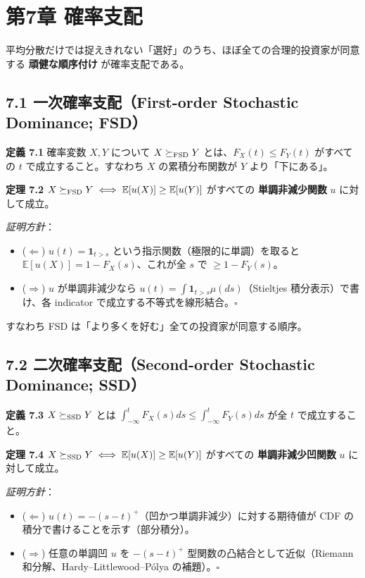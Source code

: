 \documentclass[11pt,a4paper]{report}
\begin{document}
\noindent\hrulefill

\chapter{第7章 確率支配}

平均分散だけでは捉えきれない「選好」のうち、ほぼ全ての合理的投資家が同意する \textbf{頑健な順序付け} が確率支配である。

\section{7.1 一次確率支配（First-order Stochastic Dominance; FSD）}

\textbf{定義 7.1} 確率変数 $X, Y$ について $X \succeq_{\rm FSD} Y$ とは、$F_X(t) \le F_Y(t)$ がすべての $t$ で成立すること。すなわち $X$ の累積分布関数が $Y$ より「下にある」。

\textbf{定理 7.2} $X \succeq_{\rm FSD} Y \iff \mathbb{E}[u(X)] \ge \mathbb{E}[u(Y)]$ がすべての \textbf{単調非減少関数} $u$ に対して成立。

\emph{証明方針}：
\begin{itemize}
\item ($\Leftarrow$) $u(t) = \mathbf{1}_{t > s}$ という指示関数（極限的に単調）を取ると $\mathbb{E}[u(X)] = 1 - F_X(s)$、これが全 $s$ で $\ge 1 - F_Y(s)$。
\item ($\Rightarrow$) $u$ が単調非減少なら $u(t) = \int \mathbf{1}_{t > s} \mu(ds)$（Stieltjes 積分表示）で書け、各 indicator で成立する不等式を線形結合。$\square$
\end{itemize}

すなわち FSD は「より多くを好む」全ての投資家が同意する順序。

\section{7.2 二次確率支配（Second-order Stochastic Dominance; SSD）}

\textbf{定義 7.3} $X \succeq_{\rm SSD} Y$ とは $\int_{-\infty}^t F_X(s) ds \le \int_{-\infty}^t F_Y(s) ds$ が全 $t$ で成立すること。

\textbf{定理 7.4} $X \succeq_{\rm SSD} Y \iff \mathbb{E}[u(X)] \ge \mathbb{E}[u(Y)]$ がすべての \textbf{単調非減少凹関数} $u$ に対して成立。

\emph{証明方針}：
\begin{itemize}
\item ($\Leftarrow$) $u(t) = -(s - t)^+$（凹かつ単調非減少）に対する期待値が CDF の積分で書けることを示す（部分積分）。
\item ($\Rightarrow$) 任意の単調凹 $u$ を $-(s-t)^+$ 型関数の凸結合として近似（Riemann 和分解、Hardy–Littlewood–Pólya の補題）。$\square$
\end{itemize}
\end{document}
